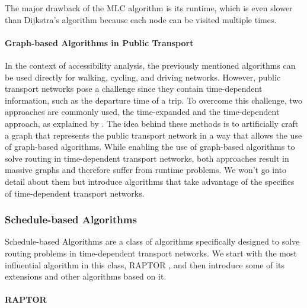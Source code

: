 The major drawback of the MLC algorithm is its runtime, which is even slower than Dijkstra's algorithm because each node can be visited multiple times.


\paragraph{Graph-based Algorithms in Public Transport}
\label{subsubsec:graph_based_algorithms_in_public_transport}


In the context of accessibility analysis, the previously mentioned algorithms can be used directly for walking, cycling, and driving networks.
However, public transport networks pose a challenge since they contain time-dependent information, such as the departure time of a trip.
To overcome this challenge, two approaches are commonly used, the time-expanded and the time-dependent approach, as explained by .
The idea behind these methods is to artificially craft a graph that represents the public transport network in a way that allows the use of graph-based algorithms.
While enabling the use of graph-based algorithms to solve routing in time-dependent transport networks, both approaches result in massive graphs and therefore suffer from runtime problems. We won't go into detail about them but introduce algorithms that take advantage of the specifics of time-dependent transport networks.

\subsubsection{Schedule-based Algorithms}

Schedule-based Algorithms are a class of algorithms specifically designed to solve routing problems in time-dependent transport networks.
We start with the most influential algorithm in this class, RAPTOR , and then introduce some of its extensions and other algorithms based on it.

\paragraph{RAPTOR}
\label{subsubsec:raptor}

